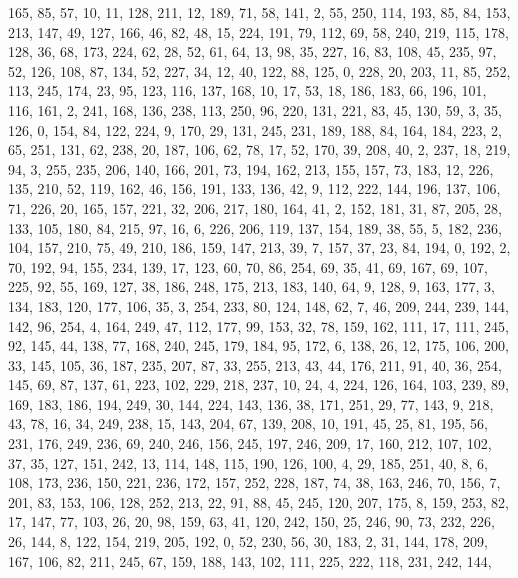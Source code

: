 \begin{DoxyCode}
       165, 85, 57, 10, 11, 128, 211, 12, 189, 71, 58, 141, 2, 55, 250, 114, 193, 85, 84, 153, 213, 147, 49, 127,
       166, 46, 82, 48, 15, 224, 191, 79, 112, 69, 58, 240, 219, 115, 178, 128, 36, 68, 173, 224, 62, 28, 52, 61, 64,
       13, 98, 35, 227, 16, 83, 108, 45, 235, 97, 52, 126, 108, 87, 134, 52, 227, 34, 12, 40, 122, 88, 125, 0, 228,
       20, 203, 11, 85, 252, 113, 245, 174, 23, 95, 123, 116, 137, 168, 10, 17, 53, 18, 186, 183, 66, 196, 101,
       116, 161, 2, 241, 168, 136, 238, 113, 250, 96, 220, 131, 221, 83, 45, 130, 59, 3, 35, 126, 0, 154, 84, 122,
       224, 9, 170, 29, 131, 245, 231, 189, 188, 84, 164, 184, 223, 2, 65, 251, 131, 62, 238, 20, 187, 106, 62, 78,
       17, 52, 170, 39, 208, 40, 2, 237, 18, 219, 94, 3, 255, 235, 206, 140, 166, 201, 73, 194, 162, 213, 155, 157,
       73, 183, 12, 226, 135, 210, 52, 119, 162, 46, 156, 191, 133, 136, 42, 9, 112, 222, 144, 196, 137, 106, 71,
       226, 20, 165, 157, 221, 32, 206, 217, 180, 164, 41, 2, 152, 181, 31, 87, 205, 28, 133, 105, 180, 84, 215, 97,
       16, 6, 226, 206, 119, 137, 154, 189, 38, 55, 5, 182, 236, 104, 157, 210, 75, 49, 210, 186, 159, 147, 213,
       39, 7, 157, 37, 23, 84, 194, 0, 192, 2, 70, 192, 94, 155, 234, 139, 17, 123, 60, 70, 86, 254, 69, 35, 41, 69,
       167, 69, 107, 225, 92, 55, 169, 127, 38, 186, 248, 175, 213, 183, 140, 64, 9, 128, 9, 163, 177, 3, 134,
       183, 120, 177, 106, 35, 3, 254, 233, 80, 124, 148, 62, 7, 46, 209, 244, 239, 144, 142, 96, 254, 4, 164, 249,
       47, 112, 177, 99, 153, 32, 78, 159, 162, 111, 17, 111, 245, 92, 145, 44, 138, 77, 168, 240, 245, 179, 184, 95,
       172, 6, 138, 26, 12, 175, 106, 200, 33, 145, 105, 36, 187, 235, 207, 87, 33, 255, 213, 43, 44, 176, 211,
       91, 40, 36, 254, 145, 69, 87, 137, 61, 223, 102, 229, 218, 237, 10, 24, 4, 224, 126, 164, 103, 239, 89, 169,
       183, 186, 194, 249, 30, 144, 224, 143, 136, 38, 171, 251, 29, 77, 143, 9, 218, 43, 78, 16, 34, 249, 238, 15,
       143, 204, 67, 139, 208, 10, 191, 45, 25, 81, 195, 56, 231, 176, 249, 236, 69, 240, 246, 156, 245, 197, 246,
       209, 17, 160, 212, 107, 102, 37, 35, 127, 151, 242, 13, 114, 148, 115, 190, 126, 100, 4, 29, 185, 251, 40,
       8, 6, 108, 173, 236, 150, 221, 236, 172, 157, 252, 228, 187, 74, 38, 163, 246, 70, 156, 7, 201, 83, 153, 106,
       128, 252, 213, 22, 91, 88, 45, 245, 120, 207, 175, 8, 159, 253, 82, 17, 147, 77, 103, 26, 20, 98, 159, 63,
       41, 120, 242, 150, 25, 246, 90, 73, 232, 226, 26, 144, 8, 122, 154, 219, 205, 192, 0, 52, 230, 56, 30, 183,
       2, 31, 144, 178, 209, 167, 106, 82, 211, 245, 67, 159, 188, 143, 102, 111, 225, 222, 118, 231, 242, 144,

\end{DoxyCode}
